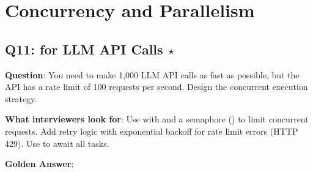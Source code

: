 \section{Concurrency and Parallelism}

\subsection{Q11:  for LLM API Calls $\star$}

\textbf{Question}: You need to make 1,000 LLM API calls as fast as possible, but the API has a rate limit of 100 requests per second. Design the concurrent execution strategy.

\textbf{What interviewers look for}: Use  with  and a semaphore () to limit concurrent requests. Add retry logic with exponential backoff for rate limit errors (HTTP 429). Use  to await all tasks.

\textbf{Golden Answer}:

